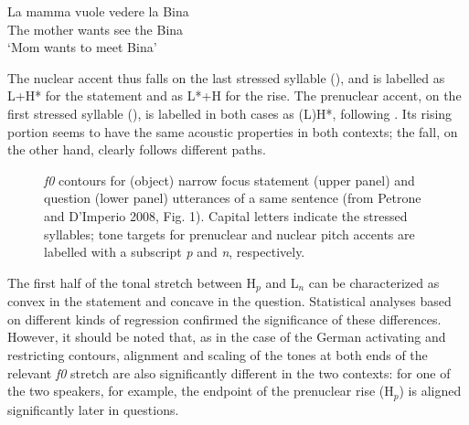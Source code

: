 \ea
\gll La mamma vuole vedere la Bina\\
The mother wants see the Bina\\
\glt ‘Mom wants to meet Bina’
\z

The nuclear accent thus falls on the last stressed syllable (), and is labelled as L+H* for the statement and as L*+H for the rise. The prenuclear accent, on the first stressed syllable (), is labelled in both cases as (L)H*, following \citet{gilifivela2003tonal,gilifivela2006coding}. Its rising portion seems to have the same acoustic properties in both contexts; the fall, on the other hand, clearly follows different paths.

\begin{figure}
\centering
{}
\caption{\textit{f0} contours for (object) narrow focus statement (upper panel) and question (lower panel) utterances of a same sentence (from Petrone and D'Imperio 2008, Fig. 1). Capital letters indicate the stressed syllables; tone targets for prenuclear and nuclear pitch accents are labelled with a subscript \textit{p} and \textit{n}, respectively.}
\label{fig210}\end{figure}

The first half of the tonal stretch between H$_{p}$ and L$_{n}$ can be characterized as convex in the statement and concave in the question. Statistical analyses based on different kinds of regression confirmed the significance of these differences. However, it should be noted that, as in the case of the German activating and restricting contours, alignment and scaling of the tones at both ends of the relevant \textit{f0} stretch are also significantly different in the two contexts: for one of the two speakers, for example, the endpoint of the prenuclear rise (H$_{p}$) is aligned significantly later in questions. 

